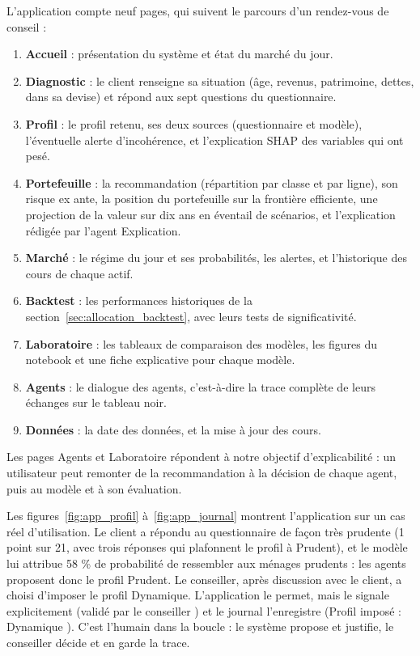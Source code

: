 L'application compte neuf pages, qui suivent le parcours d'un rendez-vous de conseil :
\begin{enumerate}
  \item \textbf{Accueil} : présentation du système et état du marché du jour.
  \item \textbf{Diagnostic} : le client renseigne sa situation (âge, revenus, patrimoine, dettes, dans sa devise) et répond aux sept questions du questionnaire.
  \item \textbf{Profil} : le profil retenu, ses deux sources (questionnaire et modèle), l'éventuelle alerte d'incohérence, et l'explication SHAP des variables qui ont pesé.
  \item \textbf{Portefeuille} : la recommandation (répartition par classe et par ligne), son risque ex ante, la position du portefeuille sur la frontière efficiente, une projection de la valeur sur dix ans en éventail de scénarios, et l'explication rédigée par l'agent Explication.
  \item \textbf{Marché} : le régime du jour et ses probabilités, les alertes, et l'historique des cours de chaque actif.
  \item \textbf{Backtest} : les performances historiques de la section~\ref{sec:allocation_backtest}, avec leurs tests de significativité.
  \item \textbf{Laboratoire} : les tableaux de comparaison des modèles, les figures du notebook et une fiche explicative pour chaque modèle.
  \item \textbf{Agents} : le dialogue des agents, c'est-à-dire la trace complète de leurs échanges sur le tableau noir.
  \item \textbf{Données} : la date des données, et la mise à jour des cours.
\end{enumerate}

Les pages Agents et Laboratoire répondent à notre objectif d'explicabilité : un utilisateur peut remonter de la recommandation à la décision de chaque agent, puis au modèle et à son évaluation.

Les figures~\ref{fig:app_profil} à~\ref{fig:app_journal} montrent l'application sur un cas réel d'utilisation. Le client a répondu au questionnaire de façon très prudente (1 point sur 21, avec trois réponses qui plafonnent le profil à Prudent), et le modèle lui attribue 58 \% de probabilité de ressembler aux ménages prudents : les agents proposent donc le profil Prudent. Le conseiller, après discussion avec le client, a choisi d'imposer le profil Dynamique. L'application le permet, mais le signale explicitement (\og validé par le conseiller \fg{}) et le journal l'enregistre (\og Profil imposé : Dynamique \fg{}). C'est l'humain dans la boucle : le système propose et justifie, le conseiller décide et en garde la trace.

